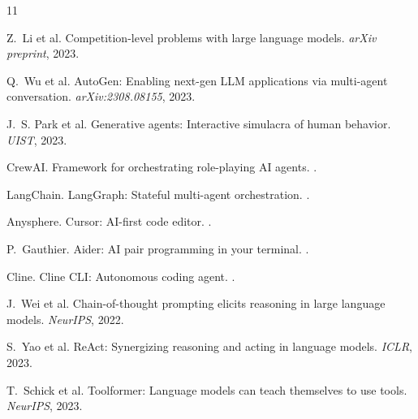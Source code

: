 \documentclass[12pt]{article}
\begin{document}

\begin{thebibliography}{11}

Z.~Li et al.
\newblock Competition-level problems with large language models.
\newblock \emph{arXiv preprint}, 2023.

Q.~Wu et al.
\newblock AutoGen: Enabling next-gen LLM applications via multi-agent conversation.
\newblock \emph{arXiv:2308.08155}, 2023.

J.~S. Park et al.
\newblock Generative agents: Interactive simulacra of human behavior.
\newblock \emph{UIST}, 2023.

CrewAI.
\newblock Framework for orchestrating role-playing AI agents.
.

LangChain.
\newblock LangGraph: Stateful multi-agent orchestration.
.

Anysphere.
\newblock Cursor: AI-first code editor.
.

P.~Gauthier.
\newblock Aider: AI pair programming in your terminal.
.

Cline.
\newblock Cline CLI: Autonomous coding agent.
.

J.~Wei et al.
\newblock Chain-of-thought prompting elicits reasoning in large language models.
\newblock \emph{NeurIPS}, 2022.

S.~Yao et al.
\newblock ReAct: Synergizing reasoning and acting in language models.
\newblock \emph{ICLR}, 2023.

T.~Schick et al.
\newblock Toolformer: Language models can teach themselves to use tools.
\newblock \emph{NeurIPS}, 2023.

\end{thebibliography}
\end{document}
